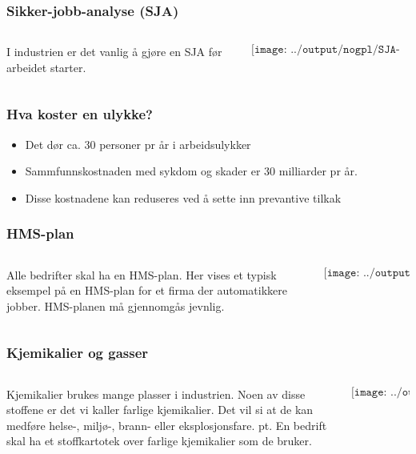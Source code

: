 \documentclass[aspectratio=169,xcolor=dvipsnames]{beamer}
\begin{document}
\begin{frame}
	\frametitle{Sikker-jobb-analyse (SJA)}
	\begin{columns}
		\begin{column}{0.5\textwidth}
I industrien er det vanlig å gjøre en SJA før arbeidet starter. 
			
		\end{column}


		\begin{column}{0.5\textwidth}
	$$\texttt{[image: ../output/nogpl/SJA-skjema.png]}$$
		\end{column}
	\end{columns}
\end{frame}
\begin{frame}
	\frametitle{Hva koster en ulykke?}	
\begin{itemize}
	\item Det dør ca. 30 personer pr år i arbeidsulykker
	\item Sammfunnskostnaden med sykdom og skader er 30 milliarder pr år. 
	\item Disse kostnadene kan reduseres ved å sette inn prevantive tilkak 
\end{itemize}



\end{frame}
\begin{frame}
	\frametitle{HMS-plan}
	\begin{columns}
		\begin{column}{0.5\textwidth}
	Alle bedrifter skal ha en HMS-plan. Her vises et typisk eksempel på en HMS-plan for et firma der automatikkere jobber.  
	\vskip 10pt
	HMS-planen må gjennomgås jevnlig. 
		\end{column}


		\begin{column}{0.5\textwidth}
	$$\texttt{[image: ../output/nogpl/pPerMasSik03.png]}$$
		\end{column}
	\end{columns}
\end{frame}

\begin{frame}
	\frametitle{Kjemikalier og gasser}
	\begin{columns}
		\begin{column}{0.5\textwidth}
	Kjemikalier brukes mange plasser i industrien. Noen av disse stoffene er det vi kaller farlige kjemikalier. Det vil si at de kan medføre helse-, miljø-, brann- eller eksplosjonsfare. 
	 pt. 
	En bedrift skal ha et stoffkartotek over farlige kjemikalier som de bruker. 
			
		\end{column}

		\begin{column}{0.5\textwidth}
	$$\texttt{[image: ../output/nogpl/pPerMasSik04.png]}$$
		\end{column}
	\end{columns}
\end{frame}
\end{document}
